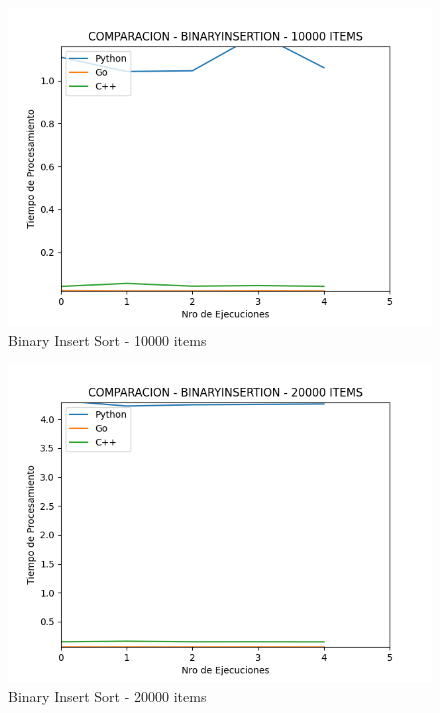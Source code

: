\documentclass[12pt]{article} %
\begin{document}
    \vspace{5mm}
    
    \begin{figure}[H]
    \centering
    \includegraphics[width=\textwidth]{binaryInsertion_10000}
    \caption{Binary Insert Sort - 10000 items}
    \end{figure}

    \vspace{5mm}
    
    \begin{figure}[H]
    \centering
    \includegraphics[width=\textwidth]{binaryInsertion_20000}
    \caption{Binary Insert Sort - 20000 items}
    \end{figure}
\end{document}
